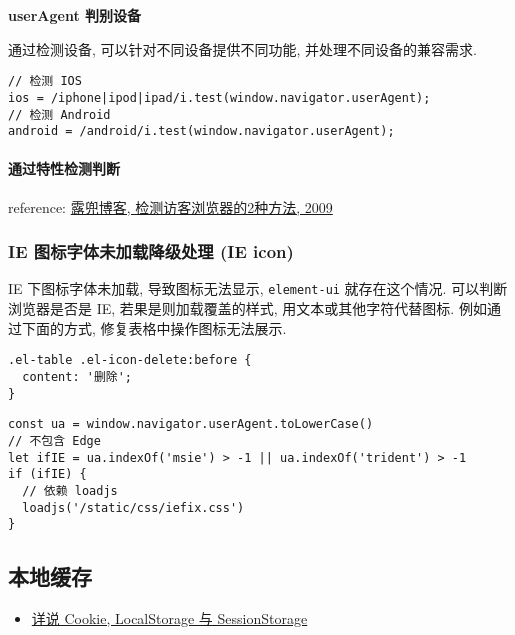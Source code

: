\textbf{userAgent 判别设备}

通过检测设备, 可以针对不同设备提供不同功能, 并处理不同设备的兼容需求.

\begin{lstlisting}
// 检测 IOS
ios = /iphone|ipod|ipad/i.test(window.navigator.userAgent);
// 检测 Android
android = /android/i.test(window.navigator.userAgent);
\end{lstlisting}

\paragraph{通过特性检测判断}\label{ux901aux8fc7ux7279ux6027ux68c0ux6d4bux5224ux65ad}

reference:
\href{http://www.ludou.org/2-way-to-detect-browser.html}{露兜博客,
检测访客浏览器的2种方法, 2009}

\subsubsection{IE 图标字体未加载降级处理 (IE
icon)}\label{ie-ux56feux6807ux5b57ux4f53ux672aux52a0ux8f7dux964dux7ea7ux5904ux7406-ie-icon}

IE 下图标字体未加载, 导致图标无法显示, \lstinline!element-ui!
就存在这个情况. 可以判断浏览器是否是 IE, 若果是则加载覆盖的样式,
用文本或其他字符代替图标. 例如通过下面的方式,
修复表格中操作图标无法展示.

\begin{lstlisting}
.el-table .el-icon-delete:before {
  content: '删除';
}
\end{lstlisting}

\begin{lstlisting}
const ua = window.navigator.userAgent.toLowerCase()
// 不包含 Edge
let ifIE = ua.indexOf('msie') > -1 || ua.indexOf('trident') > -1
if (ifIE) {
  // 依赖 loadjs
  loadjs('/static/css/iefix.css')
}
\end{lstlisting}

\subsection{本地缓存}\label{ux672cux5730ux7f13ux5b58}

\begin{itemize}
\tightlist
\item
  \href{http://jerryzou.com/posts/cookie-and-web-storage/}{详说 Cookie,
  LocalStorage 与 SessionStorage}
\end{itemize}

